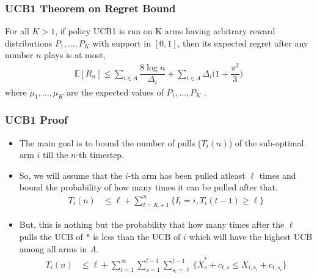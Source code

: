 \begin{frame}
\frametitle{UCB1 Theorem on Regret Bound}
\begin{theorem}
For all $K > 1$, if policy UCB1 is run on K arms having arbitrary reward
distributions $P_{1}, . . . , P_{K}$ with support in $[0, 1]$, then its expected regret after any number $n$ plays is at most,
\begin{align*}
\mathbb{E}[R_n]\leq \sum_{i\in A}\dfrac{8\log n}{\Delta_{i}} + \sum_{i\in A}\Delta_{i}\bigg(1+\dfrac{\pi^{2}}{3}\bigg) 
\end{align*}
where $\mu_{1}, . . . , \mu_{K}$ are the expected values of $P_{1}, . . . , P_{K}$ .
\end{theorem}
\end{frame}

\begin{frame}
\frametitle{UCB1 Proof}
\begin{itemize}
\item<1-> The main goal is to bound the number of pulls ($T_i(n)$) of the sub-optimal arm $i$ till the $n$-th timestep.
\item<2-> So, we will assume that the $i$-th arm has been pulled atleast $\ell$ times and bound the probability of how many times it can be pulled after that.
\begin{align*}
T_{i}(n)&\leq \ell +\sum_{t=K+1}^{n}\lbrace I_t=i, T_i(t-1)\geq \ell\rbrace
\end{align*}
\item<3-> But, this is nothing but the probability that how many times after the $\ell$ pulls the  UCB of $*$ is less than the UCB of $i$ which will have the highest UCB among all arms in $A$.
\begin{align*}
T_{i}(n)&\leq \ell + \sum_{t=1}^{\infty}\sum_{s=1}^{t-1}\sum_{s_i =\ell}^{t-1}\lbrace \bar{X}_{s}^{*} + c_{t,s} \leq \bar{X}_{i,s_i} + c_{t,s_i} \rbrace
\end{align*}
\end{itemize}
\end{frame}

